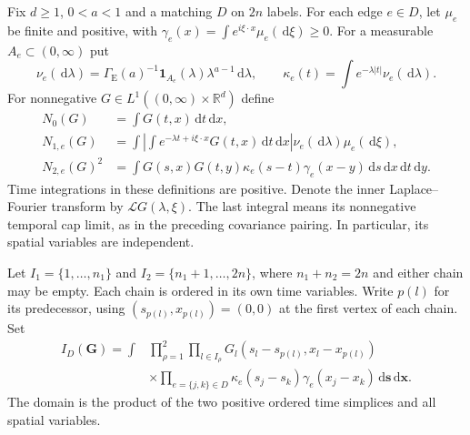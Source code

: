 \documentclass[12pt,oneside,openany]{book}
\numberwithin{equation}{section}
\theoremstyle{nogostyle}
\theoremstyle{definition}
\newcommand{\R}{\mathbb{R}}
\newcommand{\ud}{\,\mathrm{d}}
\begin{document}
Fix $d \ge 1$, $0 < a < 1$ and a matching $D$ on $2n$ labels. For each edge $e
\in D$, let $\mu_e$ be finite and positive, with $\gamma_e(x) = \int
e^{i\xi\cdot x}\mu_e(\ud\xi) \ge 0$. For a measurable $A_e \subset (0,\infty)$
put
\[
  \nu_e(\ud\lambda)=\Gamma_{\mathrm{E}}(a)^{-1}
  \mathbf1_{A_e}(\lambda)\lambda^{a-1}\ud\lambda,
  \qquad \kappa_e(t)=\int e^{-\lambda|t|}\nu_e(\ud\lambda).
\]
For nonnegative $G \in L^1((0,\infty)\times\R^d)$ define
\begin{equation}\label{E:pairing-edge-norms}
  \begin{split}
    N_0(G)&=\int G(t,x)\ud t\ud x,\\
    N_{1,e}(G)&=\int\left|\int e^{-\lambda t+i\xi\cdot x}
    G(t,x)\ud t\ud x\right|\nu_e(\ud\lambda)\mu_e(\ud\xi),\\
    N_{2,e}(G)^2&=\int G(s,x)G(t,y)
    \kappa_e(s-t)\gamma_e(x-y)\ud s\ud x\ud t\ud y.
  \end{split}
\end{equation}
Time integrations in these definitions are positive. Denote the inner
Laplace--Fourier transform by $\mathcal{L} G(\lambda,\xi)$. The last integral
means its nonnegative temporal cap limit, as in the preceding covariance
pairing. In particular, its spatial variables are independent.

Let $I_1 = \{1,\ldots,n_1\}$ and $I_2 = \{n_1+1,\ldots,2n\}$, where $n_1+n_2 =
2n$ and either chain may be empty. Each chain is ordered in its own time
variables. Write $p(l)$ for its predecessor, using $(s_{p(l)},x_{p(l)}) = (0,0)$
at the first vertex of each chain. Set
\begin{equation}\label{E:pairing-diagram-general}
  \begin{split}
    I_D(\boldsymbol G)=\int
    &\prod_{\rho=1}^2\prod_{l\in I_\rho}
    G_l(s_l-s_{p(l)},x_l-x_{p(l)})\\
    &\times\prod_{e=\{j,k\}\in D}
    \kappa_e(s_j-s_k)\gamma_e(x_j-x_k)
    \ud\boldsymbol s\ud\boldsymbol x .
  \end{split}
\end{equation}
The domain is the product of the two positive ordered time simplices and all
spatial variables.
\end{document}

